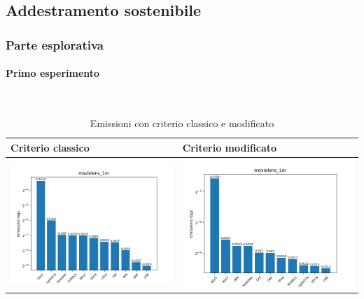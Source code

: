 \subsection{Addestramento sostenibile}
\subsubsection{Parte esplorativa}
\paragraph{Primo esperimento} \textcolor{white}{.} \\
\begin{table}[H]
    \centering
    \footnotesize
    \setlength\tabcolsep{0pt}
    \begin{tabularx}{\textwidth}{|X|X|}
        \hline
        \textbf{Criterio classico} & \textbf{Criterio modificato} \\
        \hline
        \includegraphics[width=\linewidth, trim=0 0 0 0]{images/emissions_movielens_1m_earlyClassic.png} &
        \includegraphics[width=\linewidth, trim=0 0 0 0]{images/emissions_movielens_1m_earlyModified.png} \\
        \hline
    \end{tabularx}
    \caption{Emissioni con criterio classico e modificato}
    \label{tab:emissions_info}
\end{table}

